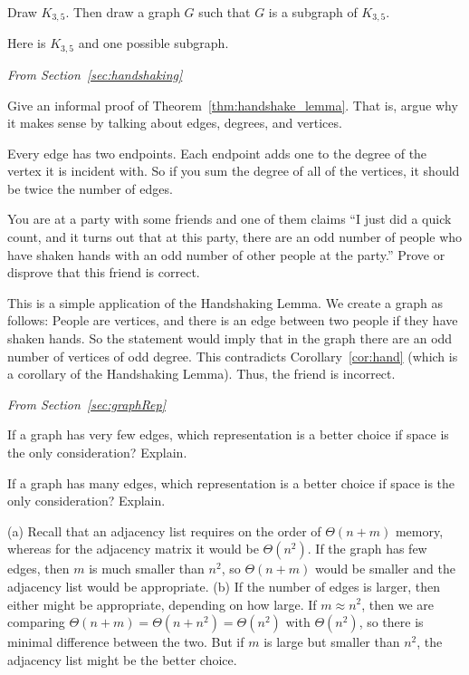 \begin{requ}
Draw $K_{3,5}$.  Then draw a graph $G$ such that $G$ is a subgraph of $K_{3,5}$.
\begin{requanswer}
Here is $K_{3,5}$ and one possible subgraph.

\end{requanswer}
\end{requ}

\noindent
{\em From Section~\ref{sec:handshaking}}
\begin{requ}
Give an informal proof of Theorem~\ref{thm:handshake_lemma}.
That is, argue why it makes sense by talking about edges, degrees, and vertices.
\begin{requanswer}
Every edge has two endpoints. 
Each endpoint adds one to the degree of the vertex it is incident with.
So if you sum the degree of all of the vertices, it should be twice the number of edges.
\end{requanswer}
\end{requ}

\begin{requ}
You are at a party with some friends and one of them claims 
``I just did a quick count, and it turns out that at this party,
there are an odd number of people who have shaken hands with an odd number of other people at the party.''
Prove or disprove that this friend is correct.
\begin{requanswer}
This is a simple application of the Handshaking Lemma.
We create a graph as follows: 
People are vertices, and there is an edge between two people if they have shaken hands.
So the statement would imply that in the graph there are an odd number of vertices of odd degree.
This contradicts Corollary~\ref{cor:hand} (which is a corollary of the Handshaking Lemma).
Thus, the friend is incorrect.
\end{requanswer}
\end{requ}

\noindent
{\em From Section~\ref{sec:graphRep}}
\begin{requ}
\begin{lenum}
\item If a graph has very few edges, which representation is a better choice if space is the only consideration? Explain.
\item If a graph has many edges, which representation is a better choice if space is the only consideration? Explain.
\end{lenum}
\begin{requanswer}
(a) Recall that an adjacency list requires on the order of $\Theta(n+m)$ memory, whereas for the
adjacency matrix it would be $\Theta(n^2)$. 
If the graph has few edges, then $m$ is much smaller than $n^2$, so $\Theta(n+m)$ would be smaller
and the adjacency list would be appropriate.
(b) If the number of edges is larger, then either might be appropriate, depending on how large. If 
$m\approx n^2$, then we are comparing $\Theta(n+m)=\Theta(n+n^2)=\Theta(n^2)$ with $\Theta(n^2)$,
so there is minimal difference between the two. But if $m$ is large but smaller than $n^2$, the adjacency list
might be the better choice.
\end{requanswer}
\end{requ}

